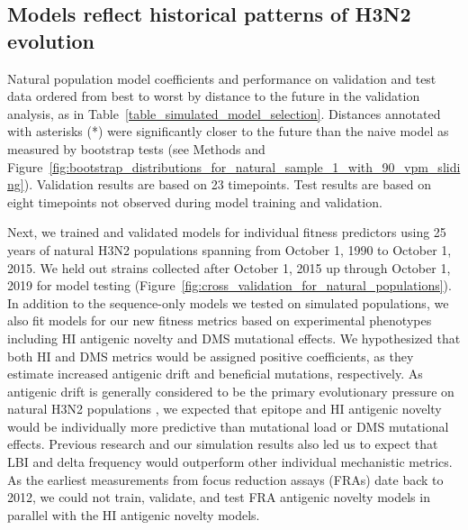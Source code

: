 \subsection*{Models reflect historical patterns of H3N2 evolution}

\begin{table}
  \begin{center}
    \scalebox{0.9}{
      
    }
    \caption{
      Natural population model coefficients and performance on validation and test data ordered from best to worst by distance to the future in the validation analysis, as in Table~\ref{table_simulated_model_selection}.
      Distances annotated with asterisks (*) were significantly closer to the future than the naive model as measured by bootstrap tests (see Methods and Figure~\ref{fig:bootstrap_distributions_for_natural_sample_1_with_90_vpm_sliding}).
      Validation results are based on 23 timepoints.
      Test results are based on eight timepoints not observed during model training and validation.
    }
    \label{table_natural_model_selection}
  \end{center}
\end{table}

Next, we trained and validated models for individual fitness predictors using 25 years of natural H3N2 populations spanning from October 1, 1990 to October 1, 2015.
We held out strains collected after October 1, 2015 up through October 1, 2019 for model testing (Figure~\ref{fig:cross_validation_for_natural_populations}).
In addition to the sequence-only models we tested on simulated populations, we also fit models for our new fitness metrics based on experimental phenotypes including HI antigenic novelty and DMS mutational effects.
We hypothesized that both HI and DMS metrics would be assigned positive coefficients, as they estimate increased antigenic drift and beneficial mutations, respectively.
As antigenic drift is generally considered to be the primary evolutionary pressure on natural H3N2 populations \citep{Smith:2004jc,Bedford:2014bf,Luksza:2014hj}, we expected that epitope and HI antigenic novelty would be individually more predictive than mutational load or DMS mutational effects.
Previous research \citep{Neher:2014eu} and our simulation results also led us to expect that LBI and delta frequency would outperform other individual mechanistic metrics.
As the earliest measurements from focus reduction assays (FRAs) date back to 2012, we could not train, validate, and test FRA antigenic novelty models in parallel with the HI antigenic novelty models.

